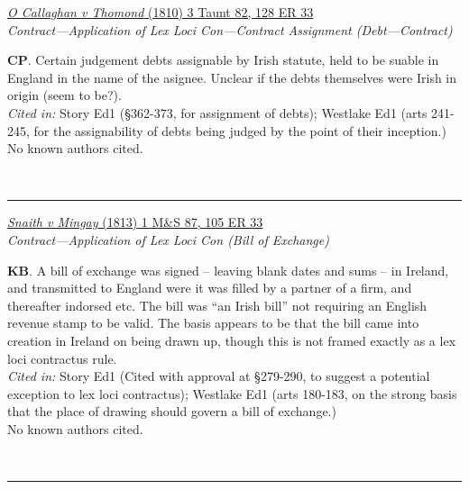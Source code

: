 \documentclass[twoside]{article}
\begin{document}
        \begin{small}
        \begin{center}
        \href{https://heinonline.org/HOL/P?h=hein.engrep/engrg0128&i=37}{\textit{O Callaghan v Thomond} (1810) 3 Taunt 82, 128 ER 33} \label{44} \\ 
\textit{Contract---Application of Lex Loci Con---Contract Assignment (Debt---Contract)}\\
        \end{center}
        \textbf{CP}. Certain judgement debts assignable by Irish statute, held to be suable in England in the name of the asignee. Unclear if the debts themselves were Irish in origin (seem to be?).\\\textit{Cited in: }Story Ed1 (§362-373, for assignment of debts); Westlake Ed1 (arts 241-245, for the assignability of debts being judged by the point of their inception.)\\No known authors cited.
        \end{small}\\
        \rule{\textwidth}{0.5pt}
        

        \begin{small}
        \begin{center}
        \href{https://heinonline.org/HOL/P?h=hein.engrep/engrf0105&i=37}{\textit{Snaith v Mingay} (1813) 1 M\&S 87, 105 ER 33} \label{32} \\ 
\textit{Contract---Application of Lex Loci Con (Bill of Exchange)}\\
        \end{center}
        \textbf{KB}. A bill of exchange was signed – leaving blank dates and sums – in Ireland, and transmitted to England were it was filled by a partner of a firm, and thereafter indorsed etc. The bill was “an Irish bill” not requiring an English revenue stamp to be valid. The basis appears to be that the bill came into creation in Ireland on being drawn up, though this is not framed exactly as a lex loci contractus rule.\\\textit{Cited in: }Story Ed1 (Cited with approval at §279-290, to suggest a potential exception to lex loci contractus); Westlake Ed1 (arts 180-183, on the strong basis that the place of drawing should govern a bill of exchange.)\\No known authors cited.
        \end{small}\\
        \rule{\textwidth}{0.5pt}
        
\end{document}

